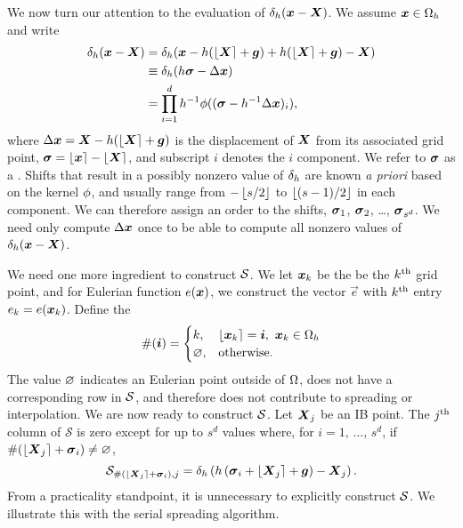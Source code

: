 We now turn our attention to the evaluation of $\delta_h(\boldsymbol{x}-\boldsymbol{X})$. We assume
$\boldsymbol{x}\in\Omega_h$ and write
\begin{equation}
    \label{eq:delta-defs}
    \begin{aligned}
        \delta_h(\boldsymbol{x}-\boldsymbol{X})
        &= \delta_h(\boldsymbol{x}-h(\left\lfloor{\boldsymbol{X}}\right\rceil+\boldsymbol{g}) + h(\left\lfloor{\boldsymbol{X}}\right\rceil+\boldsymbol{g}) - \boldsymbol{X}) \\
        &\equiv \delta_h(h\boldsymbol{\sigma} - \Delta\boldsymbol{x}) \\
        &= \prod_{i=1}^d h^{-1}\phi((\boldsymbol{\sigma} - h^{-1}\Delta\boldsymbol{x})_i),
    \end{aligned}
\end{equation}
where $\Delta\boldsymbol{x} = \boldsymbol{X}-h(\left\lfloor{\boldsymbol{X}}\right\rceil+\boldsymbol{g})$ is the displacement of $\boldsymbol{X}$ from its associated
grid point, $\boldsymbol{\sigma}=\left\lfloor{\boldsymbol{x}}\right\rceil-\left\lfloor{\boldsymbol{X}}\right\rceil$, and subscript $i$ denotes the $i$ component. We
refer to $\boldsymbol{\sigma}$ as a . Shifts that result in a possibly nonzero value of
$\delta_h$ are known \emph{a priori} based on the kernel $\phi$, and usually range
from $-\left\lfloor{s/2}\right\rfloor$ to $\left\lfloor{(s-1)/2}\right\rfloor$ in each component. We can therefore assign an
order to the shifts, $\boldsymbol{\sigma}_1$, $\boldsymbol{\sigma}_2$, \dots, $\boldsymbol{\sigma}_{s^d}$. We need only compute
$\Delta\boldsymbol{x}$ once to be able to compute all nonzero values of $\delta_h(\boldsymbol{x}-\boldsymbol{X})$.

We need one more ingredient to construct $\mathcal{S}$. We let $\boldsymbol{x}_k$ be the be the $k\textsuperscript{th}$
grid point, and for Eulerian function $e(\boldsymbol{x})$, we construct the vector $\vec{e}$ with
$k\textsuperscript{th}$ entry $e_k = e(\boldsymbol{x}_k)$. Define the 
\begin{equation}
    \label{eq:grid-index-fn}
    \#(\boldsymbol{i}) = \begin{cases}
        k, & \left\lfloor{\boldsymbol{x}_k}\right\rceil=\boldsymbol{i},\ \boldsymbol{x}_k\in\Omega_h \\
        \varnothing, & \text{otherwise}.
    \end{cases}
\end{equation}
The value $\varnothing$ indicates an Eulerian point outside of $\Omega$, does not have a
corresponding row in $\mathcal{S}$, and therefore does not contribute to spreading or
interpolation. We are now ready to construct $\mathcal{S}$. Let $\boldsymbol{X}_j$ be an IB
point. The $j\textsuperscript{th}$ column of $\mathcal{S}$ is zero except for up to $s^d$ values where,
for $i=1,\,\ldots,\,s^d$, if $\#(\left\lfloor{\boldsymbol{X}_j}\right\rceil+\boldsymbol{\sigma}_i)\neq\varnothing$,
\begin{equation}
    \label{eq:s-columnwise}
    \mathcal{S}_{\#\left(\left\lfloor{\boldsymbol{X}_j}\right\rceil+\boldsymbol{\sigma}_i\right),j} = \delta_h\left(h\left(\boldsymbol{\sigma}_i+\left\lfloor{\boldsymbol{X}_j}\right\rceil+\boldsymbol{g}\right)-\boldsymbol{X}_j\right).
\end{equation}
From a practicality standpoint, it is unnecessary to explicitly construct $\mathcal{S}$. We
illustrate this with the serial spreading algorithm.

